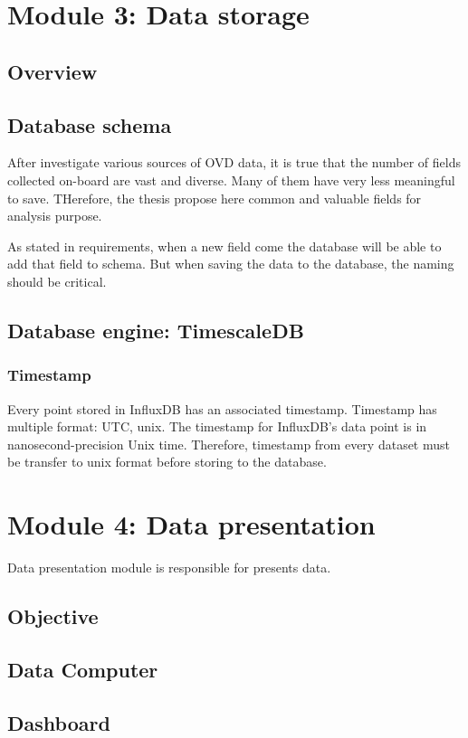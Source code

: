 \section{Module 3: Data storage}
\subsection{Overview}

\subsection{Database schema}
After investigate various sources of OVD data, it is true that the number of fields collected on-board are vast and diverse. Many of them have very less meaningful to save. THerefore, the thesis propose here common and valuable fields for analysis purpose.




As stated in requirements, when a new field come the database will be able to add that field to schema. But when saving the data to the database, the naming should be critical.

\subsection{Database engine: TimescaleDB}
\subsubsection{Timestamp}
Every point stored in InfluxDB has an associated timestamp. Timestamp has multiple format: UTC, unix. The timestamp for InfluxDB's data point is in nanosecond-precision Unix time.
Therefore, timestamp from every dataset must be transfer to unix format before storing to the database.

\section{Module 4: Data presentation}
Data presentation module is responsible for presents data.
\subsection{Objective}
\subsection{Data Computer}
\subsection{Dashboard}




